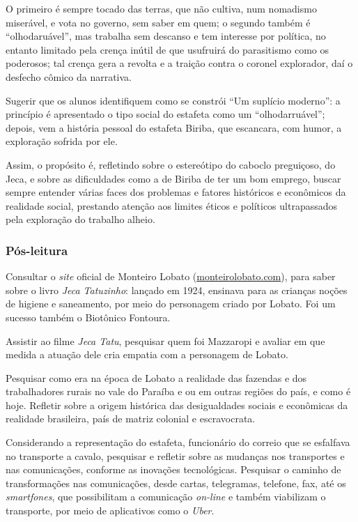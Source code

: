 \documentclass[11pt]{extarticle}
\begin{document}
O primeiro é sempre tocado das terras, que não
cultiva, num nomadismo miserável, e vota no governo, sem saber em quem;
o segundo também é ``olhodaruável'', mas trabalha sem descanso e tem
interesse por política, no entanto limitado pela crença inútil de que
usufruirá do parasitismo como os poderosos; tal crença gera a revolta e
a traição contra o coronel explorador, daí o desfecho cômico da
narrativa.


Sugerir que os alunos identifiquem como se constrói ``Um suplício
moderno'': a princípio é apresentado o tipo social do estafeta como um
``olhodarruável''; depois, vem a história pessoal do estafeta Biriba,
que escancara, com humor, a exploração sofrida por ele.

Assim, o propósito é, refletindo sobre o estereótipo do caboclo
preguiçoso, do Jeca, e sobre as dificuldades como a de Biriba de ter um
bom emprego, buscar sempre entender várias faces dos problemas e fatores
históricos e econômicos da realidade social, prestando atenção aos
limites éticos e políticos ultrapassados pela exploração do trabalho
alheio.

\subsubsection{Pós-leitura}

Consultar o \emph{site} oficial de Monteiro Lobato
(\href{http://www.monteirolobato.com/miscelania/jeca-tatuzinho}{monteirolobato.com}), para
saber sobre o livro \emph{Jeca Tatuzinho}: lançado em 1924, ensinava
para as crianças noções de higiene e saneamento, por meio do personagem
criado por Lobato. Foi um sucesso também o Biotônico Fontoura.

Assistir ao filme \emph{Jeca Tatu}, pesquisar quem foi Mazzaropi e
avaliar em que medida a atuação dele cria empatia com a personagem de
Lobato.


Pesquisar como era na época de Lobato a realidade das fazendas e dos
trabalhadores rurais no vale do Paraíba e ou em outras regiões do país,
e como é hoje. Refletir sobre a origem histórica das desigualdades
sociais e econômicas da realidade brasileira, país de matriz colonial e
escravocrata.

Considerando a representação do estafeta, funcionário do correio que se
esfalfava no transporte a cavalo, pesquisar e refletir sobre as mudanças
nos transportes e nas comunicações, conforme as inovações tecnológicas.
Pesquisar o caminho de transformações nas comunicações, desde cartas,
telegramas, telefone, fax, até os \emph{smartfones}, que possibilitam a
comunicação \emph{on-line} e também viabilizam o transporte, por meio de
aplicativos como o \emph{Uber}.
\end{document}
